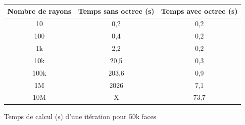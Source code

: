 \begin{tableth}
	\begin{tabular}{| c | c | c |}
		\hline
		Nombre de rayons & Temps \textbf{sans} \gls{octree} (s)& Temps \textbf{avec} \gls{octree} (s)\\
		  \hline
		  \hline
		   10 &0,2&	0,2 \\
		   \hline
		100 &0,4	&0,2 \\
		   \hline
		1k & 2,2	&0,2\\
		   \hline
		10k & 20,5&	0,3\\
		   \hline
		100k & 203,6&	0,9\\
		   \hline
		1M &2026 &	7,1 \\
		\hline
		10M & X &	73,7 \\
		\hline
	 \end{tabular}
	\caption{Temps de calcul (s) d'une itération pour 50k faces}
	\label{tabComplexite2}
\end{tableth}

